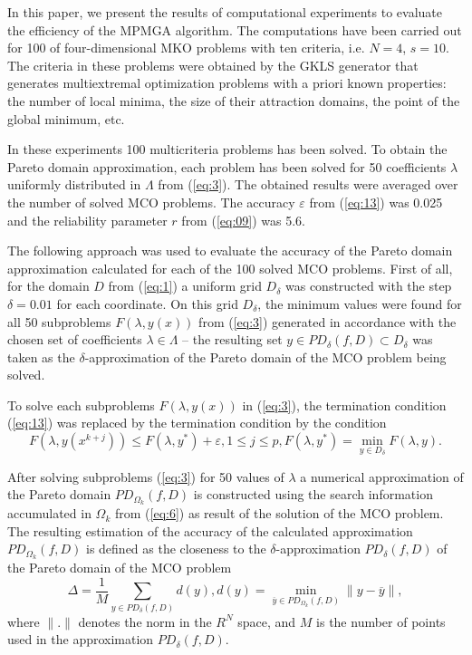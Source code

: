 In this paper, we present the results of computational experiments to evaluate the efficiency of the MPMGA algorithm. The computations have been carried out for 100 of four-dimensional MKO problems with ten criteria, i.e. $N = 4$, $s = 10$. The criteria in these problems were obtained by the GKLS generator \cite{c23} that generates multiextremal optimization problems with a priori known properties: the number of local minima, the size of their attraction domains, the point of the global minimum, etc. 

In these experiments 100 multicriteria problems has been solved. To obtain the Pareto domain approximation, each problem has been solved for 50 coefficients $\lambda$ uniformly distributed in $\Lambda$ from (\ref{eq:3}). The obtained results were averaged over the number of solved MCO problems. The accuracy $\varepsilon$ from (\ref{eq:13}) was 0.025 and the reliability parameter $r$ from (\ref{eq:09}) was 5.6.

The following approach was used to evaluate the accuracy of the Pareto domain approximation calculated for each of the 100 solved MCO problems. First of all, for the domain $D$ from (\ref{eq:1}) a uniform grid $D_\delta$ was constructed with the step $\delta = 0.01$ for each coordinate. On this grid $D_\delta$, the minimum values were found for all 50 subproblems $F(\lambda,y(x))$  from (\ref{eq:3}) generated in accordance with the chosen set of coefficients $\lambda \in \Lambda$ -- the resulting set $y\in PD_\delta (f,D)\subset D_\delta$ was taken as the $\delta$-approximation of the Pareto domain of the MCO problem being solved.

To solve each subproblems $F(\lambda,y(x))$ in (\ref{eq:3}), the termination condition (\ref{eq:13}) was replaced by the termination condition by the condition
\begin{equation*}
F(\lambda,y(x^{k+j})) \leq F(\lambda,y^* )+\varepsilon,1 \leq j \leq p,  F(\lambda,y^*) = \min_{y\in D_\delta}⁡{F(\lambda,y)}.
\end{equation*}

After solving subproblems (\ref{eq:3}) for 50 values of $\lambda$ a numerical approximation of the Pareto domain $PD_{\Omega_k}(f,D)$ is constructed using the search information accumulated in $\Omega_k$ from (\ref{eq:6}) as result of the solution of the MCO problem. The resulting estimation of the accuracy of the calculated approximation $PD_{\Omega_k}(f,D)$ is defined as the closeness to the $\delta$-approximation $PD_\delta(f,D)$ of the Pareto domain of the MCO problem 
\begin{equation}\label{eq:18}
\Delta=\frac{1}{M} \sum_{y\in PD_\delta(f,D)}{d(y)}, d(y)=\min_{\overline{y}\in PD_{\Omega_k}(f,D)}{⁡\|y-\overline{y}\|},
\end{equation}
where $\|.\|$ denotes the norm in the $R^N$ space, and $M$ is the number of points used in the approximation $PD_{\delta}(f,D)$.

